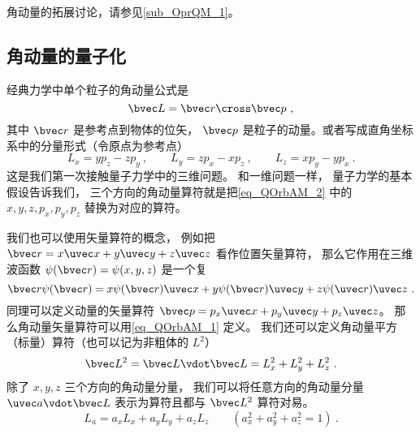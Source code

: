 
\begin{issues}
\issueDraft
\issueMissDepend
\end{issues}



角动量的拓展讨论，请参见\autoref{sub_OprQM_1}。

\subsection{角动量的量子化}

经典力学中单个粒子的角动量公式是
\begin{equation}\label{eq_QOrbAM_1}
\bvec L = \bvec r \cross \bvec p~,
\end{equation}
其中 $\bvec r$ 是参考点到物体的位矢， $\bvec p$ 是粒子的动量。或者写成直角坐标系中的分量形式（令原点为参考点）
\begin{equation}\label{eq_QOrbAM_2}
L_x = y p_z - z p_y ~,\qquad
L_y = z p_x - x p_z ~,\qquad
L_z = x p_y - y p_x~.
\end{equation}   
这是我们第一次接触量子力学中的三维问题。 和一维问题一样， 量子力学的基本假设告诉我们， 三个方向的角动量算符就是把\autoref{eq_QOrbAM_2} 中的 $x, y, z, p_x, p_y, p_z$ 替换为对应的算符。

我们也可以使用矢量算符的概念， 例如把 $\bvec r = x\uvec x + y\uvec y + z\uvec z$ 看作位置矢量算符， 那么它作用在三维波函数 $\psi(\bvec r) = \psi(x, y, z)$ 是一个复
\begin{equation}
\bvec r \psi(\bvec r) = x \psi(\bvec r) \uvec x + y \psi(\bvec r) \uvec y + z \psi(\uvec r) \uvec z~.
\end{equation}
同理可以定义动量的矢量算符 $\bvec p = p_x \uvec x + p_y\uvec y + p_z\uvec z$。 那么角动量矢量算符可以用\autoref{eq_QOrbAM_1} 定义。 我们还可以定义角动量平方（标量）算符（也可以记为非粗体的 $L^2$）
\begin{equation}
\bvec L^2 = \bvec L \vdot \bvec L = L_x^2 + L_y^2 + L_z^2~.
\end{equation}
除了 $x, y, z$ 三个方向的角动量分量， 我们可以将任意方向的角动量分量 $\uvec a \vdot \bvec L$ 表示为算符且都与 $\bvec L^2$ 算符对易。
\begin{equation}
L_a = a_x L_x + a_y L_y + a_z L_z \qquad (a_x^2 + a_y^2 + a_z^2 = 1)~.
\end{equation}

